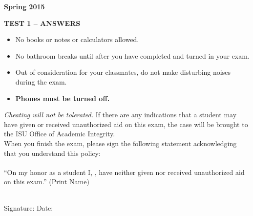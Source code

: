 \documentclass[fleqn,12pt]{article}
\newcommand{\<}{\ensuremath{\langle}}
\renewcommand{\>}{\ensuremath{\rangle}}
\begin{document}
\pagestyle{empty}
{}
\hfill {\bf Spring 2015}
\begin{center}
  {\bf TEST 1 -- ANSWERS}
  \thispagestyle{empty}
\end{center}
\vskip1cm
\begin{itemize}
\item No books or notes or calculators allowed.
\item No bathroom breaks until after you have completed and turned in your exam.
\item Out of consideration for your classmates, do not make
  disturbing noises during the exam.
\item {\bf Phones must be turned off.}
\end{itemize}
\vskip1cm
    {\it Cheating will not be tolerated.}  If there are any indications that a
    student may have given or received unauthorized aid on this exam, the case 
    will be brought to the ISU Office of Academic Integrity.%
    \\
    When you finish the exam, please sign the following statement acknowledging that you understand 
    this policy:\\
    \\
    ``On my honor as a student I,
    \underline{\phantom{XXXXXXXXXXXXXXXX}}, have neither
    given nor received unauthorized aid on this exam.''
    \hbox{} \hskip 1cm {\small (Print Name)}\\
    \\
    \begin{flushright} Signature: \underline{\phantom{XXXXXXXXXXXXXXXXXXXXXXXX}}
      Date: \underline{\phantom{XXXXXXXXXX}}
    \end{flushright}


    \newpage
\end{document}
